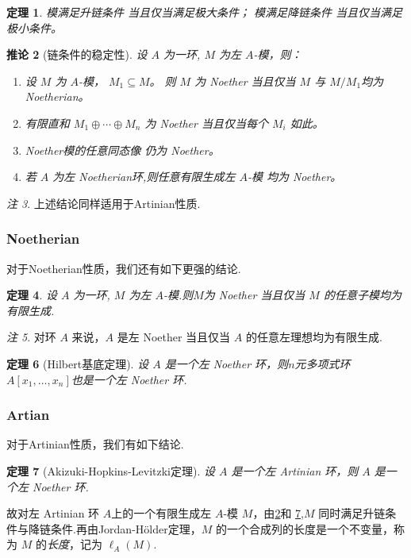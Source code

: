 \documentclass[11pt]{article}
\theoremstyle{plain}
\newtheorem{theorem}{定理}[section]
\newtheorem{corollary}[theorem]{推论}
\theoremstyle{definition}
\theoremstyle{remark}
\newtheorem{remark}[theorem]{注}
\begin{document}
\begin{theorem}\label{thm:chain-max}
    模满足升链条件
    当且仅当满足极大条件；
    模满足降链条件
    当且仅当满足极小条件。
\end{theorem}

\begin{corollary}[链条件的稳定性]\label{cor:chain-stability}
    设 $A$ 为一环, $M$ 为左 $A$-模，则：
    \begin{enumerate}
        \item
              设 $M$ 为 $A$-模，
              $M_1\subseteq M$。
              则
              $M$ 为 Noether
              当且仅当
              $M$  与  $M/M_1 $均为 Noetherian。


        \item
              有限直和  $M_1\oplus\cdots\oplus M_n$
              为 Noether   当且仅当每个 $M_i$ 如此。

        \item
              Noether模的任意同态像
              仍为 Noether。

        \item
              若 $A$ 为左 Noetherian环,则任意有限生成左 $A$-模
              均为 Noether。
    \end{enumerate}
\end{corollary}
\begin{remark}
    上述结论同样适用于Artinian性质.
\end{remark}
\subsubsection{Noetherian}
对于Noetherian性质，我们还有如下更强的结论.
\begin{theorem}
    设 $A$ 为一环, $M$ 为左 $A$-模.则$M$为 Noether 当且仅当 $M$ 的任意子模均为有限生成.
\end{theorem}
\begin{remark}
    对环 $A$ 来说，$A$ 是左 Noether 当且仅当 $A$ 的任意左理想均为有限生成.
\end{remark}

\begin{theorem}[Hilbert基底定理]
    设 $A$ 是一个左 Noether 环，则$n$元多项式环$A[x_1,\dots,x_n]$也是一个左 Noether 环.
\end{theorem}
\subsubsection{Artian}
对于Artinian性质，我们有如下结论.
\begin{theorem}[Akizuki-Hopkins-Levitzki定理]
    \label{thm:Akizuki-Hopkins-Levitzki}
    设 $A$ 是一个左 Artinian 环，则 $A$ 是一个左 Noether 环.
\end{theorem}
故对左 Artinian 环 $A$上的一个有限生成左 $A$-模 $M$，由\ref{cor:chain-stability}和 \ref{thm:Akizuki-Hopkins-Levitzki},$M$ 同时满足升链条件与降链条件.再由Jordan-Hölder定理，$M$ 的一个合成列的长度是一个不变量，称为 $M$ 的\emph{长度}，记为 $\ell_A(M)$.
\end{document}
